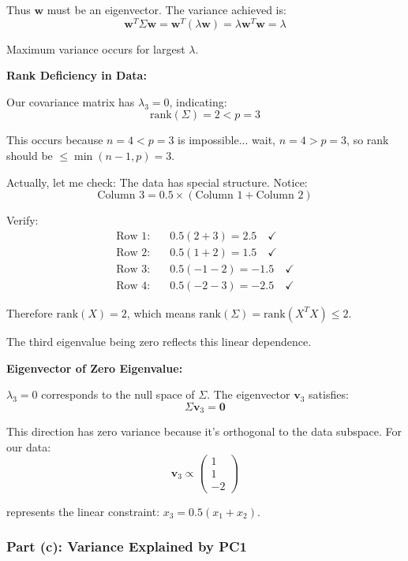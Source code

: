 \documentclass[12pt]{article}
\begin{document}
\begin{explanation}
Thus $\mathbf{w}$ must be an eigenvector. The variance achieved is:
\[
\mathbf{w}^T\Sigma\mathbf{w} = \mathbf{w}^T(\lambda\mathbf{w}) = \lambda\mathbf{w}^T\mathbf{w} = \lambda
\]

Maximum variance occurs for largest $\lambda$.

\textbf{Rank Deficiency in Data:}

Our covariance matrix has $\lambda_3 = 0$, indicating:
\[
\text{rank}(\Sigma) = 2 < p = 3
\]

This occurs because $n = 4 < p = 3$ is impossible... wait, $n=4 > p=3$, so rank should be $\leq \min(n-1, p) = 3$.

Actually, let me check: The data has special structure. Notice:
\[
\text{Column 3} = 0.5 \times (\text{Column 1} + \text{Column 2})
\]

Verify:
\begin{align*}
\text{Row 1:} & \quad 0.5(2+3) = 2.5 \quad \checkmark \\
\text{Row 2:} & \quad 0.5(1+2) = 1.5 \quad \checkmark \\
\text{Row 3:} & \quad 0.5(-1-2) = -1.5 \quad \checkmark \\
\text{Row 4:} & \quad 0.5(-2-3) = -2.5 \quad \checkmark
\end{align*}

Therefore $\text{rank}(X) = 2$, which means $\text{rank}(\Sigma) = \text{rank}(X^TX) \leq 2$.

The third eigenvalue being zero reflects this linear dependence.

\textbf{Eigenvector of Zero Eigenvalue:}

$\lambda_3 = 0$ corresponds to the null space of $\Sigma$. The eigenvector $\mathbf{v}_3$ satisfies:
\[
\Sigma\mathbf{v}_3 = \mathbf{0}
\]

This direction has zero variance because it's orthogonal to the data subspace. For our data:
\[
\mathbf{v}_3 \propto \begin{pmatrix}1 \\ 1 \\ -2\end{pmatrix}
\]

represents the linear constraint: $x_3 = 0.5(x_1 + x_2)$.

\end{explanation}

\subsubsection{Part (c): Variance Explained by PC1}
\end{document}
